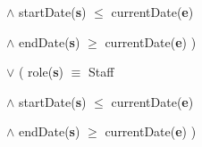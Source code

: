 \documentclass[a4paper,11pt]{article}
\begin{document}
\hspace{3.5cm}$\wedge{}$ startDate(\textbf{s}) $\leq$ currentDate(\textbf{e})\par
\hspace{3.5cm}$\wedge{}$ endDate(\textbf{s}) $\geq$ currentDate(\textbf{e}) )\par
\hspace{2.9cm}$\vee{}$ ( role(\textbf{s}) $\equiv$ Staff\par
\hspace{3.5cm}$\wedge{}$ startDate(\textbf{s}) $\leq$ currentDate(\textbf{e})\par
\hspace{3.5cm}$\wedge{}$ endDate(\textbf{s}) $\geq$ currentDate(\textbf{e}) )\par
\end{document}
